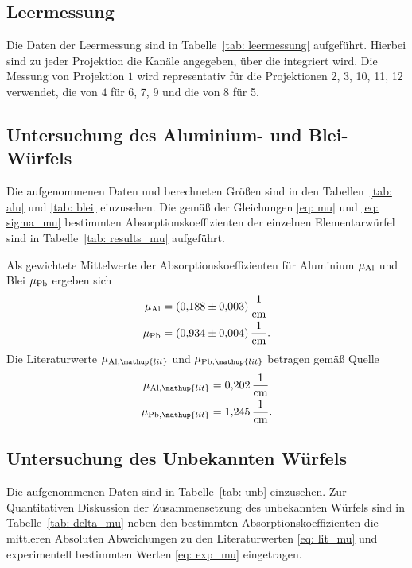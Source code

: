 \subsection{Leermessung}
Die Daten der Leermessung sind in Tabelle~\ref{tab: leermessung} aufgeführt. Hierbei sind zu jeder Projektion
die Kanäle angegeben, über die integriert wird. Die Messung von Projektion $1$ wird representativ für die
Projektionen 2, 3, 10, 11, 12 verwendet, die von $4$ für 6, 7, 9 und die von $8$ für 5.


\subsection{Untersuchung des Aluminium- und Blei-Würfels}
Die aufgenommenen Daten und berechneten Größen sind in den Tabellen~\ref{tab: alu} und \ref{tab: blei} einzusehen.
Die gemäß der Gleichungen \eqref{eq: mu} und \eqref{eq: sigma_mu} bestimmten Absorptionskoeffizienten
der einzelnen Elementarwürfel sind in Tabelle~\ref{tab: results_mu} aufgeführt.
\FloatBarrier



Als gewichtete Mittelwerte der Absorptionskoeffizienten für Aluminium $\mu_{\ce{Al}}$ und Blei $\mu_{\ce{Pb}}$
ergeben sich
\begin{align}
  \begin{aligned}
  \mu_{\ce{Al}} &= \SI{0.188(3)}{\per\centi\meter}\\
  \mu_{\ce{Pb}} &= \SI{0.934(4)}{\per\centi\meter}.
  \label{eq: exp_mu}
\end{aligned}
\end{align}
Die Literaturwerte $\mu_{\ce{Al}, \mathup{lit}}$ und $\mu_{\ce{Pb}, \mathup{lit}}$ betragen gemäß Quelle \cite{}
\begin{align}
  \begin{aligned}
  \mu_{\ce{Al}, \mathup{lit}} &= \SI{0.202}{\per\centi\meter} \\
  \mu_{\ce{Pb}, \mathup{lit}} &= \SI{1.245}{\per\centi\meter}.
  \label{eq: lit_mu}
\end{aligned}
\end{align}

\FloatBarrier

\subsection{Untersuchung des Unbekannten Würfels}
Die aufgenommenen Daten sind in Tabelle~\ref{tab: unb} einzusehen. Zur Quantitativen Diskussion der Zusammensetzung
des unbekannten Würfels sind in Tabelle~\ref{tab: delta_mu} neben den bestimmten Absorptionskoeffizienten die mittleren Absoluten
Abweichungen zu den Literaturwerten \eqref{eq: lit_mu} und experimentell bestimmten Werten \eqref{eq: exp_mu} eingetragen.
\FloatBarrier


\FloatBarrier
